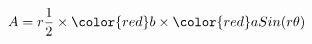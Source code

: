 \documentclass[preview]{standalone}
\begin{document}
\begin{align*}
A = r\frac{1}{2} \times \color{red}b \times \color{red}a Sin(r\theta)
\end{align*}
\end{document}

